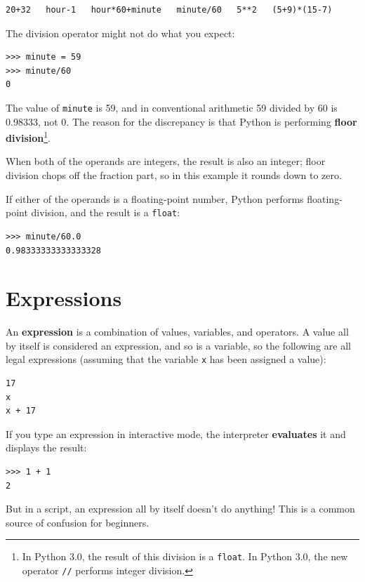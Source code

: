 \documentclass[10pt]{book}
\begin{document}
\beforeverb
\begin{verbatim}
20+32   hour-1   hour*60+minute   minute/60   5**2   (5+9)*(15-7)
\end{verbatim}
\afterverb
%
The division operator might not do what you expect:

\beforeverb
\begin{verbatim}
>>> minute = 59
>>> minute/60
0
\end{verbatim}
\afterverb
%
The value of {\tt minute} is 59, and in conventional arithmetic 59
divided by 60 is 0.98333, not 0.  The reason for the discrepancy is
that Python is performing {\bf floor division}\footnote{In Python 3.0,
the result of this division is a {\tt float}.  
In Python 3.0, the new operator
{\tt //} performs integer division.}.


When both of the operands are integers, the result is also an
integer; floor division chops off the fraction
part, so in this example it rounds down to zero.

If either of the operands is a floating-point number, Python performs
floating-point division, and the result is a {\tt float}:

\beforeverb
\begin{verbatim}
>>> minute/60.0
0.98333333333333328
\end{verbatim}
\afterverb


\section{Expressions}

An {\bf expression} is a combination of values, variables, and operators.
A value all by itself is considered an expression, and so is
a variable, so the following are all legal expressions
(assuming that the variable {\tt x} has been assigned a value):


\beforeverb
\begin{verbatim}
17
x
x + 17
\end{verbatim}
\afterverb
%
If you type an expression in interactive mode, the interpreter
{\bf evaluates} it and displays the result:

\beforeverb
\begin{verbatim}
>>> 1 + 1
2
\end{verbatim}
\afterverb
%
But in a script, an expression all by itself doesn't
do anything!  This is a common
source of confusion for beginners.
\end{document}
